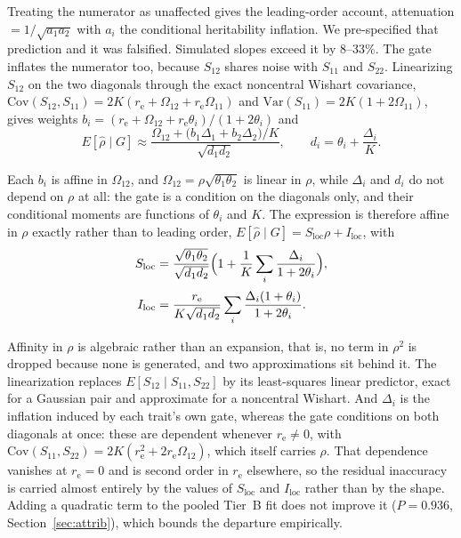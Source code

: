 \documentclass[12pt,a4paper]{article}
\newcommand{\rh}{\hat{\rho}}
\newcommand{\Slocus}{S_{\mathrm{loc}}}
\newcommand{\Ilocus}{I_{\mathrm{loc}}}
\newcommand{\re}{r_{\mathrm{e}}}
\begin{document}
Treating the numerator as unaffected gives the leading-order account, attenuation
$=1/\sqrt{a_1a_2}$ with $a_i$ the conditional heritability inflation. We pre-specified
that prediction and it was falsified. Simulated slopes exceed it by 8--33\%. The gate
inflates the numerator too, because $S_{12}$ shares noise with $S_{11}$ and $S_{22}$.
Linearizing $S_{12}$ on the two diagonals through the exact noncentral Wishart covariance,
$\mathrm{Cov}(S_{12},S_{11})=2K(\re+\Omega_{12}+\re\Omega_{11})$ and
$\mathrm{Var}(S_{11})=2K(1+2\Omega_{11})$, gives weights
$b_i=(\re+\Omega_{12}+\re\theta_i)/(1+2\theta_i)$ and
\begin{equation}
E[\rh\mid G] \approx
\frac{\Omega_{12}+\bigl(b_1\Delta_1+b_2\Delta_2\bigr)/K}{\sqrt{d_1d_2}},
\qquad d_i=\theta_i+\frac{\Delta_i}{K}.
\end{equation}

Each $b_i$ is affine in $\Omega_{12}$, and
$\Omega_{12}=\rho\sqrt{\theta_1\theta_2}$ is linear in $\rho$, while $\Delta_i$ and $d_i$
do not depend on $\rho$ at all: the gate is a condition on the diagonals only, and their
conditional moments are functions of $\theta_i$ and $K$. The expression is therefore
affine in $\rho$ exactly rather than to leading order,
$E[\rh\mid G]=\Slocus\rho+\Ilocus$, with
\begin{equation}
\begin{aligned}
\Slocus &= \frac{\sqrt{\theta_1\theta_2}}{\sqrt{d_1d_2}}
  \Bigl(1+\frac{1}{K}\sum_i \frac{\Delta_i}{1+2\theta_i}\Bigr),\\[2pt]
\Ilocus &= \frac{\re}{K\sqrt{d_1d_2}}
  \sum_i \frac{\Delta_i(1+\theta_i)}{1+2\theta_i}.
\end{aligned}
\end{equation}

Affinity in $\rho$ is algebraic rather than an expansion, that is, no term in $\rho^2$ is
dropped because none is generated, and two approximations sit behind it. The
linearization replaces $E[S_{12}\mid S_{11},S_{22}]$ by its least-squares linear predictor,
exact for a Gaussian pair and approximate for a noncentral Wishart. And $\Delta_i$ is the
inflation induced by each trait's own gate, whereas the gate conditions on both diagonals
at once: these are dependent whenever $\re\neq0$, with
$\mathrm{Cov}(S_{11},S_{22})=2K(\re^2+2\re\Omega_{12})$, which itself carries $\rho$. That
dependence vanishes at $\re=0$ and is second order in $\re$ elsewhere, so the residual
inaccuracy is carried almost entirely by the values of $\Slocus$ and $\Ilocus$ rather than
by the shape. Adding a quadratic term to the pooled Tier~B fit does not improve it
($P=0.936$, Section~\ref{sec:attrib}), which bounds the departure empirically.
\end{document}
